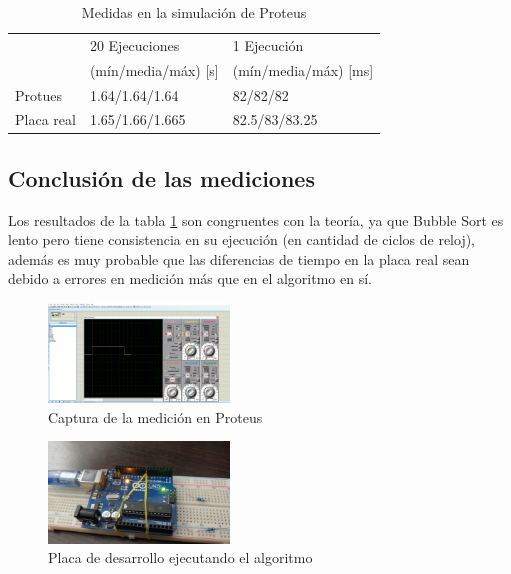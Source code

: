 \documentclass[letterpaper, 10 pt, conference]{ieeeconf}  %
\begin{document}
\begin{table}[H]
  \centering
  \begin{tabular}{|l|l|l|}
    \hline
                & 20 Ejecuciones        & 1 Ejecución           \\
                & (mín/media/máx) [s]   & (mín/media/máx) [ms]  \\ \hline
    Protues     & 1.64/1.64/1.64        & 82/82/82              \\ \hline
    Placa real  & 1.65/1.66/1.665       & 82.5/83/83.25         \\ \hline
  \end{tabular}
  \caption{Medidas en la simulación de Proteus}
  \label{tab:mediciones_proteus}
\end{table}

\subsection{Conclusión de las mediciones}
Los resultados de la tabla \ref{tab:mediciones_proteus} son congruentes con la teoría, ya que Bubble Sort es lento pero tiene consistencia en su ejecución (en cantidad de ciclos de reloj), además es muy probable que las diferencias de tiempo en la placa real sean debido a errores en medición más que en el algoritmo en sí.

\begin{figure}[H]
  \centering
  \includegraphics[width=0.43\textwidth]{./proteus_captura.png}
  \caption{Captura de la medición en Proteus}
  \label{fig:proteus_captura}
\end{figure}

\begin{figure}[H]
  \centering
  \includegraphics[width=0.43\textwidth]{./placa_real.jpeg}
  \caption{Placa de desarrollo ejecutando el algoritmo}
  \label{fig:placa_real}
\end{figure}
\end{document}
